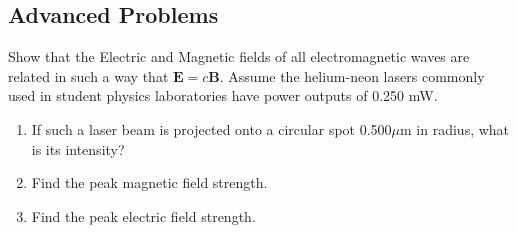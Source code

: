 \documentclass[11pt,addpoints]{exam}
\begin{document}
\begin{questions}
		\subsection*{Advanced Problems}
		\question Show that the Electric and Magnetic fields of all electromagnetic waves are related in such a way that $\textbf{E}=c\textbf{B}$.
		\question Assume the helium-neon lasers commonly used in student physics laboratories have power outputs of 0.250 mW.
		\begin{enumerate}[label=(\alph*)]
			\item If such a laser beam is projected onto a circular spot 0.500$\mu$m in radius, what is its intensity?
			\item Find the peak magnetic field strength.
			\item Find the peak electric field strength.
		\end{enumerate}
	\end{questions}		
\end{document}
